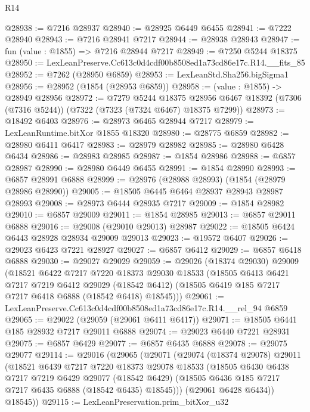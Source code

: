 \begin{lexlean}{R14}
\begin{coremodule}
@28938 := @7216 @28937
@28940 := @28925 @6449 @6455
@28941 := @7222 @28940
@28943 := @7216 @28941 @7217
@28944 := @28938 @28943
@28947 := fun (value : @1855) => @7216 @28944 @7217
@28949 := @7250 @5244 @18375
@28950 := LexLeanPreserve.Cc613c0d4cdf00b8508ed1a73cd86e17c.R14.__fits_85
@28952 := @7262 (@28950 @6859)
@28953 := LexLeanStd.Sha256.bigSigma1
@28956 := @28952 (@1854 (@28953 @6859))
@28958 := (value : @1855) -> @28949 @28956
@28972 := @7279
    @5244
    @18375
    @28956
    @6467
    @18392
    (@7306 (@7316 @5244))
    (@7322 (@7323 (@7324 @6467) @18375 @7299))
@28973 := @18492 @6403
@28976 := @28973 @6465 @28944 @7217
@28979 := LexLeanRuntime.bitXor @1855 @18320
@28980 := @28775 @6859
@28982 := @28980 @6411 @6417
@28983 := @28979 @28982
@28985 := @28980 @6428 @6434
@28986 := @28983 @28985
@28987 := @1854 @28986
@28988 := @6857 @28987
@28990 := @28980 @6449 @6455
@28991 := @1854 @28990
@28993 := @6857 @28991 @6888
@28999 := @28976 (@28988 @28993) (@1854 (@28979 @28986 @28990))
@29005 := @18505 @6445 @6464 @28937 @28943 @28987 @28993
@29008 := @28973 @6444 @28935 @7217
@29009 := @1854 @28982
@29010 := @6857 @29009
@29011 := @1854 @28985
@29013 := @6857 @29011 @6888
@29016 := @29008 (@29010 @29013) @28987
@29022 := @18505 @6424 @6443 @28928 @28934 @29009 @29013
@29023 := @19572 @6407
@29026 := @29023 @6423 @7221 @28927
@29027 := @6857 @6412
@29029 := @6857 @6418 @6888
@29030 := @29027 @29029
@29059 := @29026
    (@18374 @29030)
    @29009
    (@18521
      @6422
      @7217
      @7220
      @18373
      @29030
      @18533
      (@18505
        @6413
        @6421
        @7217
        @7219
        @6412
        @29029
        (@18542 @6412)
        (@18505 @6419 @185 @7217 @7217 @6418 @6888 (@18542 @6418) @18545)))
@29061 := LexLeanPreserve.Cc613c0d4cdf00b8508ed1a73cd86e17c.R14.__rel_94 @6859
@29065 := @29022 (@29059 (@29061 @6411 @6417))
@29071 := @18505 @6441 @185 @28932 @7217 @29011 @6888
@29074 := @29023 @6440 @7221 @28931
@29075 := @6857 @6429
@29077 := @6857 @6435 @6888
@29078 := @29075 @29077
@29114 := @29016
    (@29065
      (@29071
        (@29074
          (@18374 @29078)
          @29011
          (@18521
            @6439
            @7217
            @7220
            @18373
            @29078
            @18533
            (@18505
              @6430
              @6438
              @7217
              @7219
              @6429
              @29077
              (@18542 @6429)
              (@18505 @6436 @185 @7217 @7217 @6435 @6888 (@18542 @6435) @18545)))
          (@29061 @6428 @6434))
        @18545))
@29115 := LexLeanPreservation.prim_bitXor_u32

\end{coremodule}
\end{lexlean}
